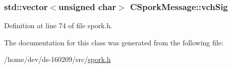 \hypertarget{class_c_spork_message_a23740331f22a1ed4a8af5a299a618cc1}{}
\subsubsection[{vch\+Sig}]{\setlength{\rightskip}{0pt plus 5cm}std\+::vector$<$unsigned char$>$ C\+Spork\+Message\+::vch\+Sig}\label{class_c_spork_message_a23740331f22a1ed4a8af5a299a618cc1}


Definition at line 74 of file spork.\+h.



The documentation for this class was generated from the following file\+:\begin{DoxyCompactItemize}
\item 
/home/dev/ds-\/160209/src/\hyperlink{spork_8h}{spork.\+h}\end{DoxyCompactItemize}
